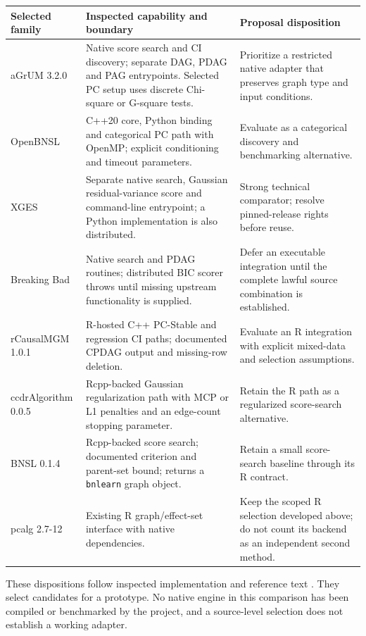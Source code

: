 \begin{longtable}{@{}p{.18\linewidth}p{.39\linewidth}p{.35\linewidth}@{}}
\toprule
Selected family & Inspected capability and boundary & Proposal disposition\\
\midrule
\endhead
aGrUM 3.2.0 & Native score search and CI discovery; separate DAG, PDAG and PAG
entrypoints. Selected PC setup uses discrete Chi-square or G-square tests. &
Prioritize a restricted native adapter that preserves graph type and input
conditions.\\
OpenBNSL & C++20 core, Python binding and categorical PC path with OpenMP;
explicit conditioning and timeout parameters. & Evaluate as a categorical
discovery and benchmarking alternative.\\
XGES & Separate native search, Gaussian residual-variance score and command-line
entrypoint; a Python implementation is also distributed. & Strong technical
comparator; resolve pinned-release rights before reuse.\\
Breaking Bad & Native search and PDAG routines; distributed BIC scorer throws
until missing upstream functionality is supplied. & Defer an executable
integration until the complete lawful source combination is established.\\
rCausalMGM 1.0.1 & R-hosted C++ PC-Stable and regression CI paths; documented
CPDAG output and missing-row deletion. & Evaluate an R integration with
explicit mixed-data and selection assumptions.\\
ccdrAlgorithm 0.0.5 & Rcpp-backed Gaussian regularization path with MCP or L1
penalties and an edge-count stopping parameter. & Retain the R path as a
regularized score-search alternative.\\
BNSL 0.1.4 & Rcpp-backed score search; documented criterion and parent-set
bound; returns a \texttt{bnlearn} graph object. & Retain a small score-search
baseline through its R contract.\\
pcalg 2.7-12 & Existing R graph/effect-set interface with native dependencies. &
Keep the scoped R selection developed above; do not count its backend as an
independent second method.\\
\bottomrule
\end{longtable}

These dispositions follow inspected implementation and reference text
\citep{exec13_cxx_agrum,exec13_cxx_openbnsl,exec13_cxx_xges,
exec13_cxx_breaking,exec13_cxx_rcausalmgm,exec13_cxx_ccdr,
exec13_cxx_bnsl,exec13_pcalg_reuse_primary}.
They select candidates for a prototype. No native engine in this comparison
has been compiled or benchmarked by the project, and a source-level selection
does not establish a working adapter.

